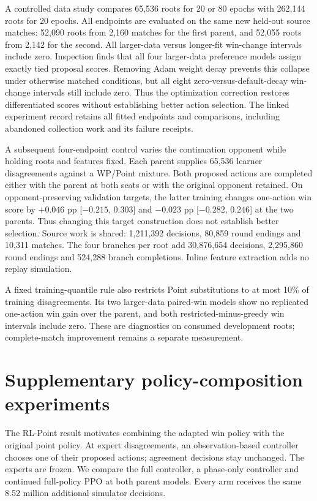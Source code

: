 \documentclass[11pt]{article}
\begin{document}
A controlled data study compares 65,536 roots for 20 or 80 epochs with
262,144 roots for 20 epochs. All endpoints are evaluated on the same new
held-out source matches: 52,090 roots from 2,160 matches for the first parent,
and 52,055 roots from 2,142 for the second. All larger-data versus longer-fit
win-change intervals include zero. Inspection finds that all four larger-data
preference models assign exactly tied proposal scores. Removing Adam weight
decay prevents this collapse under otherwise matched conditions, but all eight
zero-versus-default-decay win-change intervals still include zero. Thus the
optimization correction restores differentiated scores without establishing
better action selection. The linked experiment record retains all fitted endpoints and comparisons,
including abandoned collection work and its failure receipts.

A subsequent four-endpoint control varies the continuation opponent while
holding roots and features fixed. Each parent supplies 65,536 learner
disagreements against a WP/Point mixture. Both proposed actions are completed
either with the parent at both seats or with the original opponent retained.
On opponent-preserving validation targets, the latter training changes one-action
win score by $+0.046$ pp [$-0.215$, $0.303$] and $-0.023$ pp
[$-0.282$, $0.246$] at the two parents. Thus changing this target construction
does not establish better selection. Source work is shared: 1,211,392 decisions,
80,859 round endings and 10,311 matches. The four branches per root add
30,876,654 decisions, 2,295,860 round endings and 524,288 branch completions.
Inline feature extraction adds no replay simulation.

A fixed training-quantile rule also restricts Point substitutions to at most
10\% of training disagreements. Its two larger-data paired-win models show
no replicated one-action win gain over the parent, and both restricted-minus-greedy
win intervals include zero. These are diagnostics on consumed development roots;
complete-match improvement remains a separate measurement.

\section{Supplementary policy-composition experiments}
\label{sec:arbitration}
The RL-Point result motivates combining the adapted win policy with the
original point policy. At expert disagreements, an observation-based controller
chooses one of their proposed actions; agreement decisions stay unchanged.
The experts are frozen. We compare the full controller, a phase-only controller
and continued full-policy PPO at both parent models. Every arm receives the
same 8.52 million additional simulator decisions.
\end{document}
